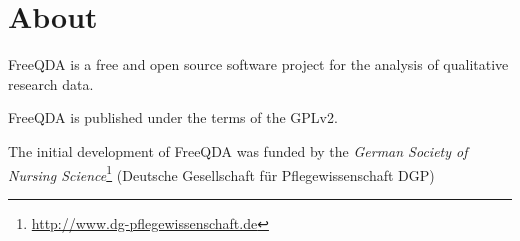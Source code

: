 \section*{About}
FreeQDA is a free and open source software project for the analysis of qualitative research data.

FreeQDA is published under the terms of the GPLv2.

The initial development of FreeQDA was funded by the \emph{German Society of Nursing Science}\footnote{\url{http://www.dg-pflegewissenschaft.de}} %
(Deutsche Gesellschaft für Pflegewissenschaft DGP)